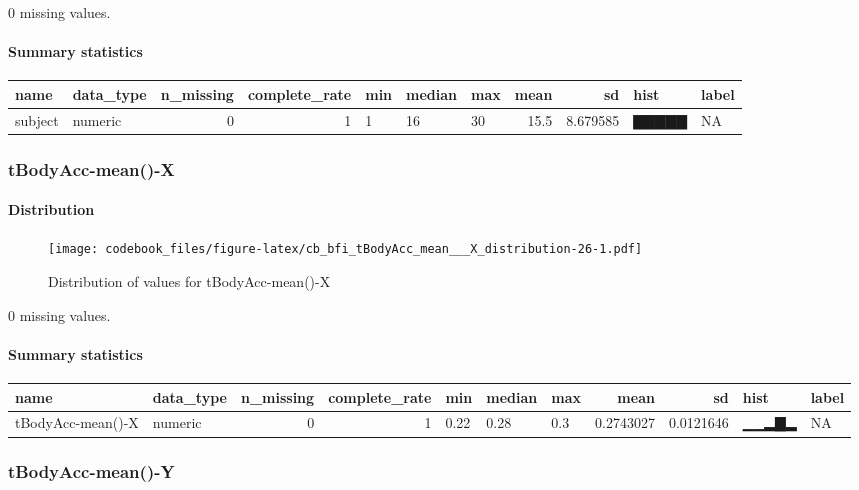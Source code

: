\documentclass[
]{article}
\begin{document}
0 missing values.

\hypertarget{subject_summary}{%
\paragraph{Summary statistics}\label{subject_summary}}

\begin{longtable}[]{@{}llrrlllrrll@{}}
\toprule
name & data\_type & n\_missing & complete\_rate & min & median & max &
mean & sd & hist & label \\
\midrule
\endhead
subject & numeric & 0 & 1 & 1 & 16 & 30 & 15.5 & 8.679585 & ▇▇▇▇▇ &
NA \\
\bottomrule
\end{longtable}

\hypertarget{tBodyAcc_mean___X}{%
\subsubsection{tBodyAcc-mean()-X}\label{tBodyAcc_mean___X}}

\hypertarget{tBodyAcc_mean___X_distribution}{%
\paragraph{Distribution}\label{tBodyAcc_mean___X_distribution}}

\begin{figure}
\centering
\texttt{[image: codebook\_files/figure-latex/cb\_bfi\_tBodyAcc\_mean\_\_\_X\_distribution-26-1.pdf]}
\caption{Distribution of values for tBodyAcc-mean()-X}
\end{figure}

0 missing values.

\hypertarget{tBodyAcc_mean___X_summary}{%
\paragraph{Summary statistics}\label{tBodyAcc_mean___X_summary}}

\begin{longtable}[]{@{}llrrlllrrll@{}}
\toprule
name & data\_type & n\_missing & complete\_rate & min & median & max &
mean & sd & hist & label \\
\midrule
\endhead
tBodyAcc-mean()-X & numeric & 0 & 1 & 0.22 & 0.28 & 0.3 & 0.2743027 &
0.0121646 & ▁▁▂▇▂ & NA \\
\bottomrule
\end{longtable}

\hypertarget{tBodyAcc_mean___Y}{%
\subsubsection{tBodyAcc-mean()-Y}\label{tBodyAcc_mean___Y}}
\end{document}
